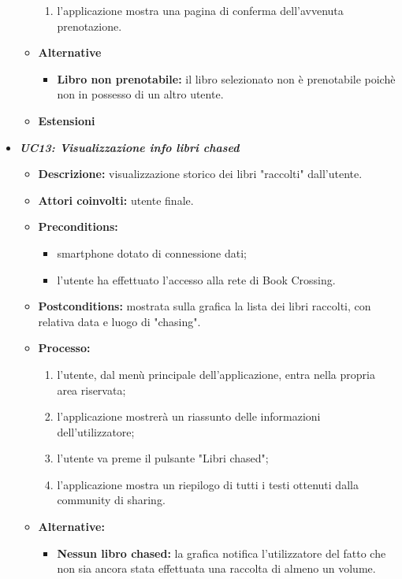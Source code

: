 \begin{itemize}
\begin{itemize}
\begin{enumerate}
			\item l'applicazione mostra una pagina di conferma dell'avvenuta prenotazione.
		\end{enumerate}
		\item \textbf{Alternative}
		\begin{itemize}
			\item \textbf{Libro non prenotabile:} il libro selezionato non è prenotabile poichè non in possesso di un altro utente.
		\end{itemize}
		\item \textbf{Estensioni}
	\end{itemize}
	\item \textbf{\textit{UC13: Visualizzazione info libri chased}}
	\begin{itemize}
		\item \textbf{Descrizione:} visualizzazione storico dei libri "raccolti" dall'utente.
		\item \textbf{Attori coinvolti:} utente finale.
		\item \textbf{Preconditions:}
		\begin{itemize}
			\item smartphone dotato di connessione dati;
			\item l’utente ha effettuato l’accesso alla rete di Book Crossing.
		\end{itemize}
		\item \textbf{Postconditions:} mostrata sulla grafica la lista dei libri raccolti, con relativa data e luogo di "chasing".
		\item \textbf{Processo:}
		\begin{enumerate}
			\item l'utente, dal menù principale dell'applicazione, entra nella propria area riservata;
			\item l'applicazione mostrerà un riassunto delle informazioni dell'utilizzatore;
			\item l'utente va preme il pulsante "Libri chased";
			\item l'applicazione mostra un riepilogo di tutti i testi ottenuti dalla community di sharing.
		\end{enumerate}
		\item \textbf{Alternative:}
		\begin{itemize}
			\item \textbf{Nessun libro chased:} la grafica notifica l'utilizzatore del fatto che non sia ancora stata effettuata una raccolta di almeno un volume.
		\end{itemize}

\end{itemize}
\end{itemize}
